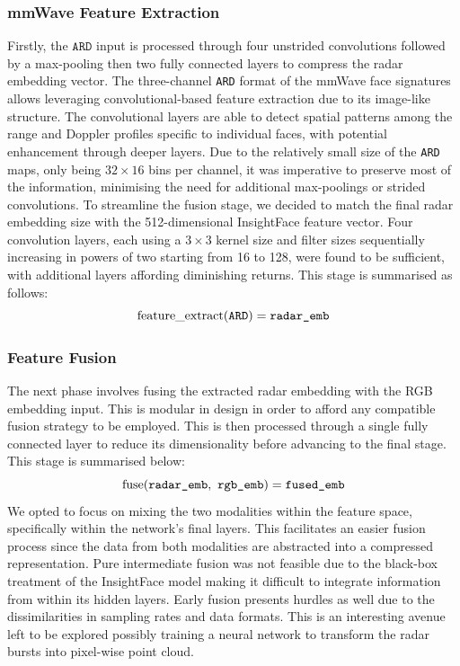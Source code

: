 \documentclass{mpaper}
\begin{document}
\subsubsection{mmWave Feature Extraction}
Firstly, the $\mathtt{ARD}$ input is processed through four unstrided convolutions followed by a max-pooling then two fully connected layers to compress the radar embedding vector. The three-channel \texttt{ARD} format of the mmWave face signatures allows leveraging convolutional-based feature extraction due to its image-like structure. The convolutional layers are able to detect spatial patterns among the range and Doppler profiles specific to individual faces, with potential enhancement through deeper layers. Due to the relatively small size of the \texttt{ARD} maps, only being $32 \times 16$ bins per channel, it was imperative to preserve most of the information, minimising the need for additional max-poolings or strided convolutions. To streamline the fusion stage, we decided to match the final radar embedding size with the 512-dimensional InsightFace feature vector. Four convolution layers, each using a $3 \times 3$ kernel size and filter sizes sequentially increasing in powers of two starting from 16 to 128, were found to be sufficient, with additional layers affording diminishing returns. This stage is summarised as follows:
$$\text{feature\_extract}(\mathtt{ARD}) = \verb|radar_emb|$$

\subsubsection{Feature Fusion}
The next phase involves fusing the extracted radar embedding with the RGB embedding input. This is modular in design in order to afford any compatible fusion strategy to be employed. This is then processed through a single fully connected layer to reduce its dimensionality before advancing to the final stage. This stage is summarised below:
$$\text{fuse}(\verb|radar_emb|, \ \verb|rgb_emb|) = \verb|fused_emb|$$
We opted to focus on mixing the two modalities within the feature space, specifically within the network's final layers. This facilitates an easier fusion process since the data from both modalities are abstracted into a compressed representation. Pure intermediate fusion was not feasible due to the black-box treatment of the InsightFace model making it difficult to integrate information from within its hidden layers. Early fusion presents hurdles as well due to the dissimilarities in sampling rates and data formats. This is an interesting avenue left to be explored possibly training a neural network to transform the radar bursts into pixel-wise point cloud.
\end{document}
